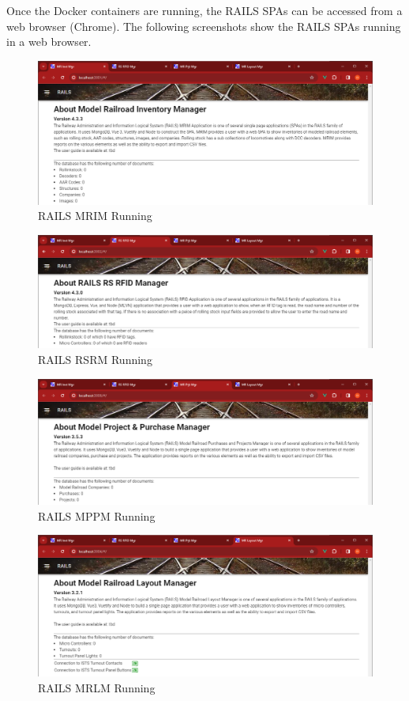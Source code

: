 Once the Docker containers are running, the \ac{RAILS} \acp{SPA} can be accessed from a web browser (Chrome). The following screenshots show the \ac{RAILS} \acp{SPA} running in a web browser.
\begin{figure}[H]
    \centering
    \includegraphics[scale=0.46]{mrim.png}
    \caption{RAILS MRIM Running}
    \label{fig:rails-mrim}
\end{figure}
\begin{figure}[H]
    \centering
    \includegraphics[scale=0.46]{rsrm.png}
    \caption{RAILS RSRM Running}
    \label{fig:rails-rsrm}
\end{figure}
\begin{figure}[H]
    \centering
    \includegraphics[scale=0.46]{mppm.png}
    \caption{RAILS MPPM Running}
    \label{fig:rails-mrim}
\end{figure}
\begin{figure}[H]
    \centering
    \includegraphics[scale=0.46]{mrlm.png}
    \caption{RAILS MRLM Running}
    \label{fig:rails-rsrm}
\end{figure}
